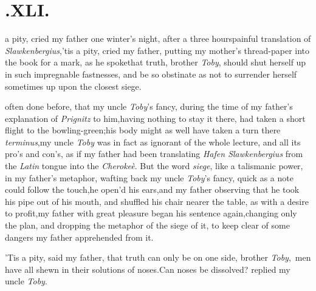 \documentclass{article}
\begin{document}
\vfill


\newpage
\null
\section{.\quad  XLI.}

 a pity, cried my father
one winter’s night, after a three hours\break painful translation
of \textit{Slawkenbergius},\tsk ’tis a pity, cried my
father, putting my mother’s thread-paper into the book for a
mark, as he spoke\tsh that truth, bro\-ther \textit{Toby},
should shut herself up in such impregnable fastnesses, and be so
obstinate as not to surrender herself sometimes up upon the closest
siege.\tsh

\noindent
{} often
done before, that my uncle \textit{Toby}’s fancy, during the
time of my father’s explanation of \textit{Prignitz} to
him,\tsh having nothing to stay it there, had taken a short
flight to the bowling-green;\tsh his body might as well have
taken a turn there
\textit{terminus},\tsh my uncle \textit{Toby} was in fact\break
as ignorant
of the whole lecture, and all its pro’s and con’s, as if my
father had been translating \textit{Hafen Slawkenbergius}\break
from the \textit{Latin} tongue into the \textit{Cherokeè}.
But the word \textit{siege}, like a talismanic\break
power, in my
father’s metaphor, wafting back my uncle \textit{Toby}’s
fancy, quick as a note could follow the touch,\tsk he open’d
his ears,\tsk and my father observing that he took his pipe
out of his mouth, and shuffled his chair nearer the table,
as with a desire to profit,\tsk my father with great
pleasure began his sentence again,\tsh changing only the
plan, and dropping the metaphor of the siege of it, to keep
clear of some dangers my father apprehended from it.

\smallskip
{}

\newpage
’Tis a pity, said my father, that truth can only be on one
side, brother \textit{Toby},\,\tsk\break
{}
men have all shewn in their solutions of
noses.\tsh Can noses be dissolved? repli\-ed my uncle
\textit{Toby}.\tsh
\end{document}
